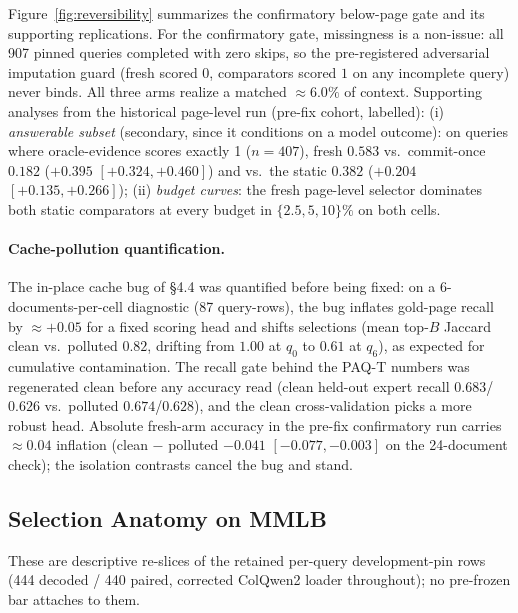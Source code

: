\documentclass[letterpaper]{article} %
\newcommand{\paqt}{\textsc{PAQ-T}}
\begin{document}
Figure~\ref{fig:reversibility} summarizes the confirmatory below-page gate and its supporting replications. For the confirmatory gate, missingness is a non-issue: all 907 pinned queries completed with zero skips, so the pre-registered adversarial imputation guard (fresh scored $0$, comparators scored $1$ on any incomplete query) never binds. All three arms realize a matched ${\approx}6.0\%$ of context. Supporting analyses from the historical page-level run (pre-fix cohort, labelled): (i) \emph{answerable subset} (secondary, since it conditions on a model outcome): on queries where oracle-evidence scores exactly 1 ($n=407$), fresh $0.583$ vs.\ commit-once $0.182$ ($+0.395$ $[+0.324,+0.460]$) and vs.\ the static $0.382$ ($+0.204$ $[+0.135,+0.266]$); (ii) \emph{budget curves}: the fresh page-level selector dominates both static comparators at every budget in $\{2.5, 5, 10\}\%$ on both cells.

\paragraph{Cache-pollution quantification.} The in-place cache bug of \S4.4 was quantified before being fixed: on a 6-documents-per-cell diagnostic (87 query-rows), the bug inflates gold-page recall by ${\approx}+0.05$ for a fixed scoring head and shifts selections (mean top-$B$ Jaccard clean vs.\ polluted $0.82$, drifting from $1.00$ at $q_0$ to $0.61$ at $q_6$), as expected for cumulative contamination. The recall gate behind the \paqt{} numbers was regenerated clean before any accuracy read (clean held-out expert recall $0.683$/$0.626$ vs.\ polluted $0.674$/$0.628$), and the clean cross-validation picks a more robust head. Absolute fresh-arm accuracy in the pre-fix confirmatory run carries ${\approx}0.04$ inflation (clean $-$ polluted $-0.041$ $[-0.077,-0.003]$ on the 24-document check); the isolation contrasts cancel the bug and stand.

\subsection{Selection Anatomy on MMLB}\label{app:anatomy}

These are descriptive re-slices of the retained per-query development-pin rows (444 decoded / 440 paired, corrected ColQwen2 loader throughout); no pre-frozen bar attaches to them.
\end{document}
